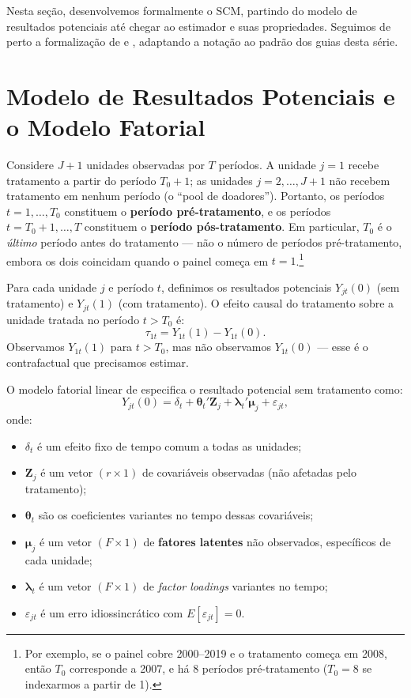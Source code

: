 \documentclass[12pt, a4paper, openany]{book}
\begin{document}
Nesta seção, desenvolvemos formalmente o SCM, partindo do modelo de resultados potenciais até chegar ao estimador e suas propriedades. Seguimos de perto a formalização de \cite{AbadieDiamondHainmueller2010} e \cite{Abadie2021}, adaptando a notação ao padrão dos guias desta série.

\section{Modelo de Resultados Potenciais e o Modelo Fatorial}

Considere $J+1$ unidades observadas por $T$ períodos. A unidade $j=1$ recebe tratamento a partir do período $T_0 + 1$; as unidades $j = 2, \ldots, J+1$ não recebem tratamento em nenhum período (o ``pool de doadores''). Portanto, os períodos $t = 1, \ldots, T_0$ constituem o \textbf{período pré-tratamento}, e os períodos $t = T_0 + 1, \ldots, T$ constituem o \textbf{período pós-tratamento}. Em particular, $T_0$ é o \textit{último} período antes do tratamento --- não o número de períodos pré-tratamento, embora os dois coincidam quando o painel começa em $t=1$.\footnote{Por exemplo, se o painel cobre 2000--2019 e o tratamento começa em 2008, então $T_0$ corresponde a 2007, e há 8 períodos pré-tratamento ($T_0 = 8$ se indexarmos a partir de 1).}

Para cada unidade $j$ e período $t$, definimos os resultados potenciais $Y_{jt}(0)$ (sem tratamento) e $Y_{jt}(1)$ (com tratamento). O efeito causal do tratamento sobre a unidade tratada no período $t > T_0$ é:
\begin{equation}
  \tau_{1t} = Y_{1t}(1) - Y_{1t}(0).
  \label{eq:tau}
\end{equation}
Observamos $Y_{1t}(1)$ para $t > T_0$, mas não observamos $Y_{1t}(0)$ --- esse é o contrafactual que precisamos estimar.

O modelo fatorial linear de \cite{AbadieDiamondHainmueller2010} especifica o resultado potencial sem tratamento como:
\begin{equation}
  Y_{jt}(0) = \delta_t + \boldsymbol{\theta}_t' \mathbf{Z}_j + \boldsymbol{\lambda}_t' \boldsymbol{\mu}_j + \varepsilon_{jt},
  \label{eq:factor_model}
\end{equation}
onde:
\begin{itemize}[leftmargin=1.5cm]
  \item $\delta_t$ é um efeito fixo de tempo comum a todas as unidades;
  \item $\mathbf{Z}_j$ é um vetor $(r \times 1)$ de covariáveis observadas (não afetadas pelo tratamento);
  \item $\boldsymbol{\theta}_t$ são os coeficientes variantes no tempo dessas covariáveis;
  \item $\boldsymbol{\mu}_j$ é um vetor $(F \times 1)$ de \textbf{fatores latentes} não observados, específicos de cada unidade;
  \item $\boldsymbol{\lambda}_t$ é um vetor $(F \times 1)$ de \textit{factor loadings} variantes no tempo;
  \item $\varepsilon_{jt}$ é um erro idiossincrático com $E[\varepsilon_{jt}] = 0$.
\end{itemize}
\end{document}
